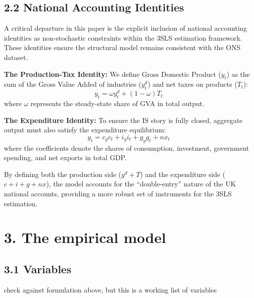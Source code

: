 \documentclass[
  letterpaper,
  DIV=11,
  numbers=noendperiod]{scrartcl}
\begin{document}
\subsection{2.2 National Accounting
Identities}\label{national-accounting-identities}

A critical departure in this paper is the explicit inclusion of national
accounting identities as non-stochastic constraints within the 3SLS
estimation framework. These identities ensure the structural model
remains consistent with the ONS dataset.

\textbf{The Production-Tax Identity:} We define Gross Domestic Product
(\(y_t\)) as the sum of the Gross Value Added of industries (\(y^d_t\))
and net taxes on products (\(T_t\)):
\[y_t = \omega y^d_t + (1-\omega) T_t\] where \(\omega\) represents the
steady-state share of GVA in total output.

\textbf{The Expenditure Identity:} To ensure the IS story is fully
closed, aggregate output must also satisfy the expenditure equilibrium:
\[y_t = c_{y}c_t + i_{y}i_t + g_{y}g_t + nx_t\] where the coefficients
denote the shares of consumption, investment, government spending, and
net exports in total GDP.

By defining both the production side (\(y^d + T\)) and the expenditure
side (\(c + i + g + nx\)), the model accounts for the ``double-entry''
nature of the UK national accounts, providing a more robust set of
instruments for the 3SLS estimation.

\section{3. The empirical model}\label{the-empirical-model}

\subsection{3.1 Variables}\label{variables}

check against formulation above, but this is a working list of variables
\end{document}
